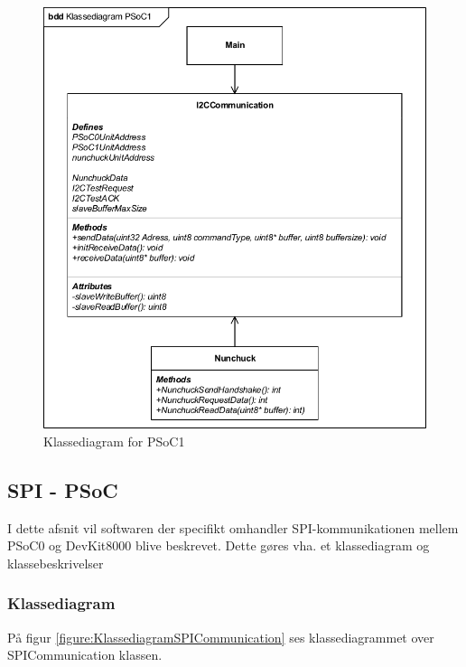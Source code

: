 \begin{figure}[H]
	\centering
	\includegraphics[width=\textwidth]{DesignOgImplementering/images/PSoC1KlassediagramOversigt.pdf}
	\caption{Klassediagram for PSoC1}
	\label{figure:klassediagramPSoC1}
\end{figure}

\subsection{SPI - PSoC}
I dette afsnit vil softwaren der specifikt omhandler SPI-kommunikationen mellem PSoC0 og DevKit8000 blive beskrevet. Dette gøres vha. et klassediagram og klassebeskrivelser

\subsubsection{Klassediagram}
På figur \ref{figure:KlassediagramSPICommunication} ses klassediagrammet over SPICommunication klassen.

